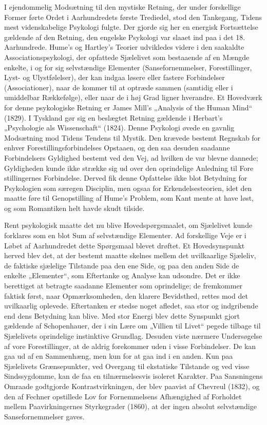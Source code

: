 \documentclass[12pt,a4paper,openany]{book}
\newcommand{\opage}[1]{\marginnote{\footnotesize\textit{[#1]}}}
\begin{document}
I ejendommelig Modsætning til den mystiske Retning, der under
forskellige Former førte Ordet i Aarhundredets første Trediedel,
stod den Tankegang, Tidens mest videnskabelige Psykologi fulgte.
Der gjorde sig her en energisk Fortsættelse gældende af den Retning,
den engelske Psykologi var slaaet ind paa i det 18. Aarhundrede.
Hume’s og Hartley’s Teorier udvikledes videre i den saakaldte
Associationspsykologi, der opfattede Sjælelivet som bestaaende af
en Mængde enkelte, i og for sig selvstændige Elementer (Sansefornemmelser,
Forestillinger, Lyst- og Ulystfølelser), der kan indgaa løsere
eller fastere Forbindelser (Associationer), naar de kommer til
at optræde sammen (samtidig eller i umiddelbar Rækkefølge), eller
naar de i høj Grad ligner hverandre. Et Hovedværk for denne psykologiske
Retning er James Mill’s „Analysis of the Human Mind“
(1829). I Tyskland gør sig en beslægtet Retning gældende i Herbart’s
„Psychologie als Wissenschaft“ (1824). Denne Psykologi øvede
en gavnlig Modsætning mod Tidens Tendens til Mystik. Den krævede
bestemt Regnskab for enhver Forestillingsforbindelses Opstaaen,
og den saa desuden saadanne Forbindelsers Gyldighed bestemt
ved den Vej, ad hvilken de var blevne dannede; Gyldigheden
kunde ikke strække sig ud over den oprindelige Anledning til Fore%
\opage{46}stillingernes Forbindelse. Derved fik denne Opfattelse ikke blot Betydning
for Psykologien som særegen Disciplin, men ogsaa for Erkendelsesteorien,
idet den maatte føre til Genopstilling af Hume’s
Problem, som Kant mente at have løst, og som Romantiken helt
havde skudt tilside.

Rent psykologisk maatte det nu blive Hovedspørgsmaalet, om
Sjælelivet kunde forklares som en blot Sum af selvstændige Elementer.
Ad forskellige Veje er i Løbet af Aarhundredet dette Spørgsmaal
blevet drøftet. Et Hovedsynspunkt herved blev det, at der
bestemt maatte skelnes mellem det uvilkaarlige Sjæleliv, de faktiske
sjælelige Tilstande paa den ene Side, og paa den anden Side de enkelte
„Elementer“, som Eftertanke og Analyse kan udsondre. Det er
ikke berettiget at betragte saadanne Elementer som oprindelige; de
fremkommer faktisk først, naar Opmærksomheden, den klarere Bevidsthed,
rettes mod det uvilkaarlig oplevede. Eftertanken er stedse
noget afledet, saa stor og indgribende end dens Betydning kan blive.
Med stor Energi blev dette Synspunkt gjort gældende af Schopenhauer,
der i sin Lære om „Villien til Livet“ pegede tilbage til Sjælelivets
oprindelige instinktive Grundlag. Desuden viste nærmere Undersøgelse
af vore Forestillinger, at de aldrig forekommer uden i
visse Forbindelser. De kan gaa ud af en Sammenhæng, men kun
for at gaa ind i en anden. Kun paa Sjælelivets Grænsepunkter, ved
Overgang til ekstatiske Tilstande og ved visse Sindssygdomme, kan
de faa en tilnærmelsesvis isoleret Karakter. Paa Sansningens Omraade
godtgjorde Kontrastvirkningen, der blev paavist af Chevreul
(1832), og den af Fechner opstillede Lov for Fornemmelsens Afhængighed
af Forholdet mellem Paavirkningernes Styrkegrader
(1860), at der ingen absolut selvstændige Sansefornemmelser gaves.
\end{document}
